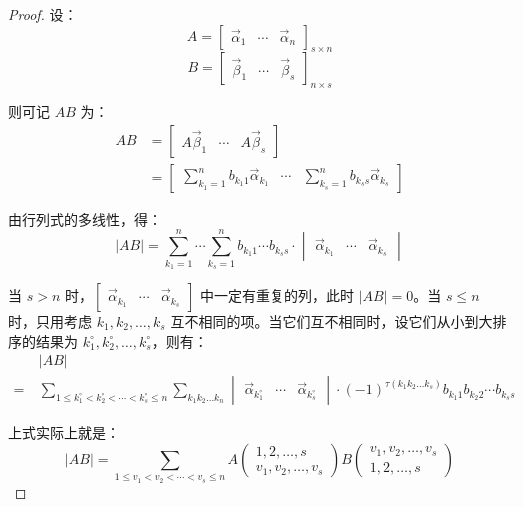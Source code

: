 \begin{proof}
	设：
	$$
	A =
	\begin{bmatrix}
		\vec \alpha_1 & \cdots & \vec \alpha_n
	\end{bmatrix}_{s \times n}
	$$$$
	B =
	\begin{bmatrix}
		\vec \beta_1 & \cdots & \vec \beta_s
	\end{bmatrix}_{n \times s}
	$$

	则可记 $AB$ 为：
	$$
	\begin{aligned}
		AB &=
		\begin{bmatrix}
			A \vec \beta_1 & \cdots & A \vec \beta_s
		\end{bmatrix}
		\\&=
		\begin{bmatrix}
			\sum\limits_{k_1 = 1}^n b_{k_1 1} \vec \alpha_{k_1} & \cdots & \sum\limits_{k_s = 1}^n b_{k_s s} \vec \alpha_{k_s}
		\end{bmatrix}
	\end{aligned}
	$$

	由行列式的多线性，得：
	$$
	|AB| = \sum\limits_{k_1 = 1}^n \cdots \sum\limits_{k_s = 1}^n b_{k_1 1} \cdots b_{k_s s} \cdot \begin{vmatrix} \vec \alpha_{k_1} & \cdots & \vec \alpha_{k_s} \end{vmatrix}
	$$

	当 $s > n$ 时，$\begin{bmatrix} \vec \alpha_{k_1} & \cdots & \vec \alpha_{k_s} \end{bmatrix}$ 中一定有重复的列，此时 $|AB| = 0$。当 $s \le n$ 时，只用考虑 $k_1, k_2, \ldots, k_s$ 互不相同的项。当它们互不相同时，设它们从小到大排序的结果为 $k_1^\circ, k_2^\circ, \ldots, k_s^\circ$，则有：
	$$
	\begin{aligned}&
		|AB|
		\\=~&
		\sum\limits_{1 \le k_1^\circ < k_2^\circ < \cdots < k_s^\circ \le n} \sum\limits_{k_1 k_2 \ldots k_n} \begin{vmatrix} \vec \alpha_{k_1^\circ} & \cdots & \vec \alpha_{k_s^\circ} \end{vmatrix} \cdot (-1)^{\tau(k_1 k_2 \ldots k_s)} b_{k_1 1} b_{k_2 2} \cdots b_{k_s s}
	\end{aligned}
	$$

	上式实际上就是：
	$$
	|AB| = \sum\limits_{1 \le v_1 < v_2 < \cdots < v_s \le n} A \begin{pmatrix} 1, 2, \ldots, s \\ v_1, v_2, \ldots, v_s \end{pmatrix} B \begin{pmatrix} v_1, v_2, \ldots, v_s \\ 1, 2, \ldots, s \end{pmatrix}
	$$
\end{proof}

